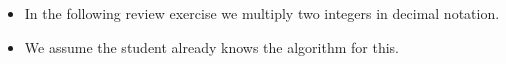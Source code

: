 \begin{frame}
\begin{itemize}
\item In the following review exercise we multiply two integers in decimal notation.
\item<2-> We assume the student already knows the algorithm for this.
\end{itemize}
\end{frame}
